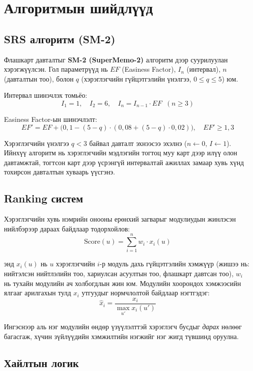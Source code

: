 \section{Алгоритмын шийдлүүд}



\subsection{SRS алгоритм (SM-2)}

Флашкарт давталтыг \textbf{SM-2 (SuperMemo-2)} алгоритм дээр суурилуулан хэрэгжүүлсэн. Гол параметрүүд нь $EF$ (Easiness Factor), $I_n$ (интервал), $n$ (давталтын тоо), болон $q$ (хэрэглэгчийн гүйцэтгэлийн үнэлгээ, $0 \le q \le 5$) юм.

Интервал шинэчлэх томьёо:
\[
I_1 = 1, \quad I_2 = 6, \quad I_n = I_{n-1} \cdot EF \;\;(n \ge 3)
\]

Easiness Factor-ын шинэчлэлт:
\[
EF' = EF + \bigl(0{,}1 - (5-q)\cdot(0{,}08 + (5-q)\cdot 0{,}02)\bigr), \quad EF' \ge 1{,}3
\]

Хэрэглэгчийн үнэлгээ $q < 3$ байвал давталт эхнээсээ эхэлнэ ($n \leftarrow 0$, $I \leftarrow 1$). Ийнхүү алгоритм нь хэрэглэгчийн мэдлэгийн тогтоц муу карт дээр илүү олон давтамжтай, тогтсон карт дээр үсрэнгүй интервалтай ажиллах замаар хувь хүнд тохирсон давталтын хуваарь үүсгэнэ.

\subsection{Ranking систем}

Хэрэглэгчийн хувь нэмрийн онооны ерөнхий загварыг модулиудын жинлэсэн нийлбэрээр дараах байдлаар тодорхойлов:
\[
\mathrm{Score}(u) = \sum_{i=1}^{n} w_i \cdot x_i(u)
\]

энд $x_i(u)$ нь $u$ хэрэглэгчийн $i$-р модуль дахь гүйцэтгэлийн хэмжүүр (жишээ нь: нийтэлсэн нийтлэлийн тоо, хариулсан асуултын тоо, флашкарт давтсан тоо), $w_i$ нь тухайн модулийн ач холбогдлын жин юм. Модулийн хоорондох хэмжээсийн ялгааг арилгахын тулд $x_i$ утгуудыг нормчлолтой байдлаар нэгтгэдэг:
\[
\hat{x}_i = \frac{x_i}{\max_{u'} x_i(u')}
\]

Ингэснээр аль нэг модулийн өндөр үзүүлэлттэй хэрэглэгч бусдыг \textit{дарах} нөлөөг багасгаж, хүчин зүйлүүдийн хэмжилтийн нэгжийг нэг жигд түвшинд оруулна.

\subsection{Хайлтын логик}

